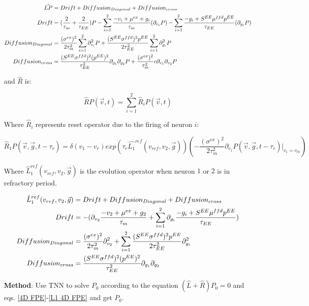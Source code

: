 \documentclass{article}
\begin{document}
	\begin{align}
		\hat{LP}&=Drift + Diffusion_{Diagonal}+Diffusion_{cross}\notag\\
		Drift&=(\frac{2}{\tau_m}+\frac{2}{\tau_{EE}})P-\sum_{i=1}^2\frac{-v_i+\mu^{ex}+g_i}{\tau_m}(\partial_{v_i}P)-\sum_{i=1}^2\frac{-g_i+S^{EE}\mu^{ffd}p^{EE}}{\tau_{EE}}(\partial_{g_i}P)\notag\\
		Diffusion_{Diagonal}&=\frac{(\sigma^{ex})^2}{2\tau_m^2}\sum_{i=1}^{2}\partial_{v_i}^2P+\frac{(S^{EE}\sigma^{ffd})^2p^{EE}}{2\tau_{EE}^2}\sum_{i=1}^{2}\partial_{g_i}^2P\notag\\
		Diffusion_{cross}&=\frac{(S^{EE}\sigma^{ffd})^2(p^{EE})^2}{\tau_{EE}^2}\partial_{g_1}\partial_{g_2}P+\frac{(\sigma^{ex})^2}{\tau_m^2}c\partial_{v_1}\partial_{v_2}P
	\end{align}
	
	and $\hat{R}$ is:
	
	\begin{equation}
		\hat{R}P(\vec{v},t)=\sum_{i=1}^{2}\hat{R}_iP(\vec{v},t)
	\end{equation}
	
	Where $\hat{R}_i$ represents reset operator due to the firing of neuron $i$:
	
	\begin{equation}
		\hat{R}_1P(\vec{v},\vec{g},t-\tau_r)=\delta(v_1-v_r)exp(\tau_r\hat{L_1}^{ref}(v_{ref},v_2,\vec{g}))(-\frac{(\sigma^{ex})^2}{2\tau_m^2}\partial_{v_1}P(\vec{v},\vec{g},t-\tau_r)|_{v_1=v_{th}})
	\end{equation}
	
	Where $\hat{L}_1^{ref}(v_{ref},v_2,\vec{g})$ is the evolution operator when neuron $1$ or $2$ is in refractory period.
	
	\begin{align}
		\hat{L}_1^{ref}(v_{ref},v_2,\vec{g})&=Drift + Diffusion_{Diagonal}+Diffusion_{cross}\notag\\
		Drift&=-(\partial_{v_2}\frac{-v_2+\mu^{ex}+g_2}{\tau_m}+\sum_{i=1}^{2}\partial_{g_i}\frac{-g_i+S^{EE}\mu^{ffd}p^{EE}}{\tau_{EE}})\notag\\
		Diffusion_{Diagonal}&=\frac{(\sigma^{ex})^2}{2\tau_m^2}\partial_{v_2}^2+\sum_{i=1}^{2}\frac{(S^{EE}\sigma^{ffd})^2p^{EE}}{2\tau_{EE}^2}\partial_{g_i}^2\notag\\
		Diffusion_{cross}&=\frac{(S^{EE}\sigma^{ffd})^2(p^{EE})^2}{\tau_{EE}^2}\partial_{g_1}\partial_{g_2}
		\label{L1 4D FPE}
	\end{align}
	
	\textbf{Method}: Use TNN to solve $P_0$ according to the equation $(\hat{L}+\hat{R})P_0=0$ and eqs. \eqref{4D FPE}-\eqref{L1 4D FPE} and get $P_0$.
	
\end{document}
